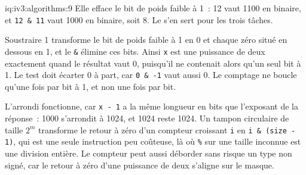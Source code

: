 \begin{solution}{iq:iv3:algorithms:9}
Elle efface le bit de poids faible à 1~: 12 vaut 1100 en binaire, et \texttt{12 \& 11} vaut 1000 en binaire, soit 8. Le  s'en sert pour les trois tâches.
\label{lst:iv3:al:bits}

Soustraire 1 transforme le bit de poids faible à 1 en 0 et chaque zéro situé en dessous en 1, et le \texttt{\&} élimine ces bits. Ainsi \texttt{x} est une puissance de deux exactement quand le résultat vaut 0, puisqu'il ne contenait alors qu'un seul bit à 1. Le test doit écarter 0 à part, car \texttt{0 \& -1} vaut aussi 0. Le comptage ne boucle qu'une fois par bit à 1, et non une fois par bit.

L'arrondi fonctionne, car \texttt{x - 1} a la même longueur en bits que l'exposant de la réponse~: 1000 s'arrondit à 1024, et 1024 reste 1024. Un tampon circulaire de taille $2^m$ transforme le retour à zéro d'un compteur croissant \texttt{i} en \texttt{i \& (size - 1)}, qui est une seule instruction peu coûteuse, là où \texttt{\%} sur une taille inconnue est une division entière. Le compteur peut aussi déborder sans risque un type non signé, car le retour à zéro d'une puissance de deux s'aligne sur le masque.

\begin{sloppypar}\end{sloppypar}
\end{solution}

